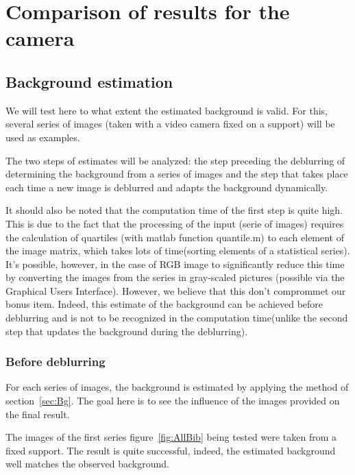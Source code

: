 \section{Comparison of results for the camera}

\subsection{Background estimation}

We will test here to what extent the estimated background is valid. For this, several series of images (taken with a video camera fixed on a support) will be used as examples.

The two steps of estimates will be analyzed: the step preceding the deblurring of determining the background from a series of images and the step that takes place each time a new image is deblurred and adapts the background dynamically.

It should also be noted that the computation time of the first step is quite high. This is due to the fact that the processing of the input (serie of images) requires the calculation of quartiles (with matlab  function quantile.m) to each element of the image matrix, which takes lots of time(sorting elements of a statistical series). It's possible, however, in the case of RGB image to significantly reduce this time by converting the images from the series in gray-scaled pictures (possible via the Graphical Users Interface).
However, we believe that this don't comprommet our bonus item. Indeed, this estimate of the background can be achieved before deblurring and is not to be recognized in the computation time(unlike the second step that updates the background during the deblurring).

\subsubsection{Before deblurring}

For each series of images, the background is estimated by applying the method of section~\ref{sec:Bg}. The goal here is to see the influence of the images provided on the final result.

The images of the first series figure~\ref{fig:AllBib} being tested were taken from a fixed support. The result is quite successful, indeed, the estimated background well matches the observed background.

